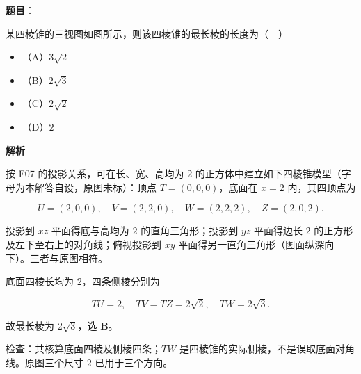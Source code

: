 \begin{answer}

\textbf{题目}：

某四棱锥的三视图如图所示，则该四棱锥的最长棱的长度为（　）
\nopagebreak[4]
\begin{center}\end{center}
\nopagebreak[4]
\begin{itemize}
\item （A）$3\sqrt2$
\item （B）$2\sqrt3$
\item （C）$2\sqrt2$
\item （D）$2$
\end{itemize}

\textbf{解析}

按 F07 的投影关系，可在长、宽、高均为 $2$ 的正方体中建立如下四棱锥模型（字母为本解答自设，原图未标）：顶点 $T=(0,0,0)$，底面在 $x=2$ 内，其四顶点为

\nopagebreak[4]
\[U=(2,0,0),\quad V=(2,2,0),\quad W=(2,2,2),\quad Z=(2,0,2).\]

投影到 $xz$ 平面得底与高均为 $2$ 的直角三角形；投影到 $yz$ 平面得边长 $2$ 的正方形及左下至右上的对角线；俯视投影到 $xy$ 平面得另一直角三角形（图面纵深向下）。三者与原图相符。

底面四棱长均为 $2$，四条侧棱分别为

\nopagebreak[4]
\[TU=2,\quad TV=TZ=2\sqrt2,\quad TW=2\sqrt3.\]

故最长棱为 $2\sqrt3$，选 \textbf{B}。

检查：共核算底面四棱及侧棱四条；$TW$ 是四棱锥的实际侧棱，不是误取底面对角线。原图三个尺寸 $2$ 已用于三个方向。


\end{answer}
